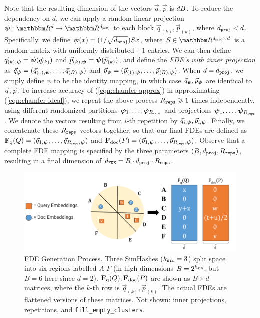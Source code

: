 Note that the resulting dimension of the vectors $\vec{q},\vec{p}$ is $d  B$. To reduce the dependency on $d$, we can apply a random linear projection $\bpsi:\R^d \to \R^{\dproj}$ to each block $\vec{q}_{(k)},\vec{p}_{(k)}$, where $d_{\texttt{proj}} < d$. Specifically, we define $\boldsymbol{\psi}(x) =(1/ \sqrt{d_{\texttt{proj}}})S x$, where  $S \in \R^{\dproj \times d}$ is a random matrix with uniformly distributed $\pm 1$ entries. We can then define  $\vec{q}_{(k),\boldsymbol{\psi}}= \boldsymbol{\psi}(\vec{q}_{(k)})$ and $\vec{p}_{(k),\boldsymbol{\psi}}= \boldsymbol{\psi}(\vec{p}_{(k)})$, and define the \emph{FDE's with inner projection} as $\vec{q}_{\boldsymbol{\psi}} =  (\vec{q}_{(1),\boldsymbol{\psi}},\dots,\vec{q}_{(B),\boldsymbol{\psi}})$ and $\vec{p}_{\boldsymbol{\psi}} = (\vec{p}_{(1),\boldsymbol{\psi}},\dots,\vec{p}_{(B),\boldsymbol{\psi}})$.  When $d=d_{\texttt{proj}}$, we simply define $\psi$ to be the identity mapping, in which case $\vec{q}_{\boldsymbol{\psi}}, \vec{p}_{\boldsymbol{\psi}}$ are identical to $\vec{q}, \vec{p}$. 
To increase accuracy of (\ref{eqn:chamfer-approx}) in approximating (\ref{eqn:chamfer-ideal}), we repeat the above process $R_{\texttt{reps}} \geqslant 1$ times independently, using different randomized partitions $\boldsymbol{\varphi}_1,\dots,\boldsymbol{\varphi}_{R_{\texttt{reps}}}$ and projections $\boldsymbol{\psi}_1,\dots,\boldsymbol{\psi}_{R_{\texttt{reps}}}$. We denote the vectors resulting from $i$-th repetition by $\vec{q}_{i,\boldsymbol{\psi}}, \vec{p}_{i,\boldsymbol{\psi}}$. Finally, we concatenate these $R_{\texttt{reps}}$ vectors together, so that our final FDEs are defined as $\mathbf{F}_{\text{q}}(Q) = (\vec{q}_{1,\boldsymbol{\psi}},\dots, \vec{q}_{R_{\texttt{reps}},\boldsymbol{\psi}})$ and $\mathbf{F}_{\text{doc}}(P) = (\vec{p}_{1,\boldsymbol{\psi}},\dots, \vec{p}_{R_{\texttt{reps}},\boldsymbol{\psi}})$. 
Observe that a complete FDE mapping is specified by the three parameters $(B, d_{\texttt{proj}}, R_{\texttt{reps}})$, resulting in a final dimension of $d_{\texttt{FDE}} =  B \cdot d_{\texttt{proj}} \cdot R_{\texttt{reps}} $. 


\begin{figure}
    \centering
    \vspace{-2em}
 \includegraphics[scale = 0.4]{plots/FDE_with_Labels.png}
    \caption{\small FDE Generation Process. Three SimHashes ($k_{\texttt{sim}} = 3$) split space into six regions labelled $A$-$F$ (in high-dimensions $B= 2^{k_{\texttt{sim}}}$, but $B=6$ here since $d=2$). $\mathbf{F}_{\text{q}}(Q),\mathbf{F}_{\text{doc}}(P)$ are shown as $B \times d$  matrices, where the $k$-th row is $\vec{q}_{(k)}, \vec{p}_{(k)}$.
   The actual FDEs are flattened versions of these matrices. Not shown: inner projections, repetitions, and \texttt{fill\_empty\_clusters}.}
    \label{fig:FDE}
\end{figure}


